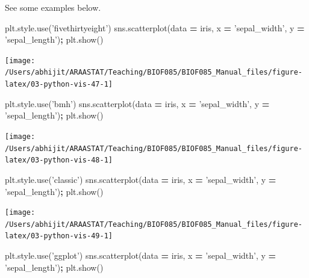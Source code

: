\documentclass[
  letterpaper,
]{scrbook}
\newenvironment{Shaded}{\begin{snugshade}}{\end{snugshade}}
\newcommand{\NormalTok}[1]{#1}
\newcommand{\OperatorTok}[1]{\textcolor[rgb]{0.81,0.36,0.00}{\textbf{#1}}}
\newcommand{\StringTok}[1]{\textcolor[rgb]{0.31,0.60,0.02}{#1}}
\begin{document}
See some examples below.

\begin{Shaded}
\begin{Highlighting}[]
\NormalTok{plt.style.use(}\StringTok{'fivethirtyeight'}\NormalTok{)}
\NormalTok{sns.scatterplot(data }\OperatorTok{=}\NormalTok{ iris, x }\OperatorTok{=} \StringTok{'sepal_width'}\NormalTok{, y }\OperatorTok{=} \StringTok{'sepal_length'}\NormalTok{)}\OperatorTok{;}
\NormalTok{plt.show()}
\end{Highlighting}
\end{Shaded}

\begin{center}\texttt{[image: /Users/abhijit/ARAASTAT/Teaching/BIOF085/BIOF085\_Manual\_files/figure-latex/03-python-vis-47-1]} \end{center}

\begin{Shaded}
\begin{Highlighting}[]
\NormalTok{plt.style.use(}\StringTok{'bmh'}\NormalTok{)}
\NormalTok{sns.scatterplot(data }\OperatorTok{=}\NormalTok{ iris, x }\OperatorTok{=} \StringTok{'sepal_width'}\NormalTok{, y }\OperatorTok{=} \StringTok{'sepal_length'}\NormalTok{)}\OperatorTok{;}
\NormalTok{plt.show()}
\end{Highlighting}
\end{Shaded}

\begin{center}\texttt{[image: /Users/abhijit/ARAASTAT/Teaching/BIOF085/BIOF085\_Manual\_files/figure-latex/03-python-vis-48-1]} \end{center}

\begin{Shaded}
\begin{Highlighting}[]
\NormalTok{plt.style.use(}\StringTok{'classic'}\NormalTok{)}
\NormalTok{sns.scatterplot(data }\OperatorTok{=}\NormalTok{ iris, x }\OperatorTok{=} \StringTok{'sepal_width'}\NormalTok{, y }\OperatorTok{=} \StringTok{'sepal_length'}\NormalTok{)}\OperatorTok{;}
\NormalTok{plt.show()}
\end{Highlighting}
\end{Shaded}

\begin{center}\texttt{[image: /Users/abhijit/ARAASTAT/Teaching/BIOF085/BIOF085\_Manual\_files/figure-latex/03-python-vis-49-1]} \end{center}

\begin{Shaded}
\begin{Highlighting}[]
\NormalTok{plt.style.use(}\StringTok{'ggplot'}\NormalTok{)}
\NormalTok{sns.scatterplot(data }\OperatorTok{=}\NormalTok{ iris, x }\OperatorTok{=} \StringTok{'sepal_width'}\NormalTok{, y }\OperatorTok{=} \StringTok{'sepal_length'}\NormalTok{)}\OperatorTok{;}
\NormalTok{plt.show()}
\end{Highlighting}
\end{Shaded}
\end{document}
